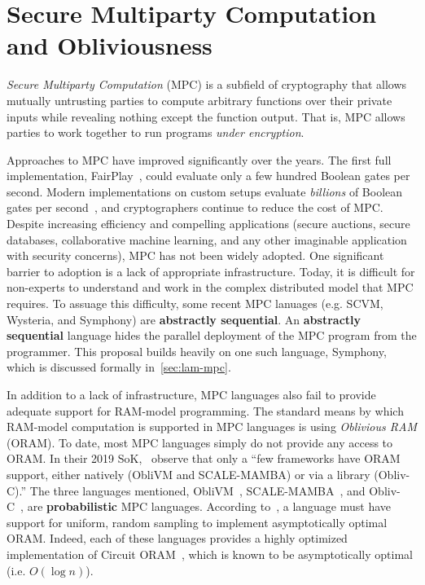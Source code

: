 \documentclass{report}
\begin{document}
\section{Secure Multiparty Computation and Obliviousness}
\label{sec:intro}

\emph{Secure Multiparty Computation} (MPC) is a subfield of cryptography
that allows mutually untrusting parties to compute arbitrary functions over their private inputs while revealing nothing
except the function output. That is, MPC allows parties to work together to run programs \emph{under encryption}.

Approaches to MPC have improved significantly over the years. The first full implementation, FairPlay~\cite{todo}, could evaluate
only a few hundred Boolean gates per second. Modern implementations on custom setups evaluate \emph{billions} of Boolean gates per
second~\cite{todo}, and cryptographers continue to reduce the cost of MPC. Despite increasing efficiency and compelling applications
(secure auctions, secure databases, collaborative machine learning, and any other imaginable application with security concerns),
MPC has not been widely adopted. One significant barrier to adoption is a lack of appropriate infrastructure. Today, it is difficult
for non-experts to understand and work in the complex distributed model that MPC requires. To assuage this difficulty, some recent
MPC lanuages (e.g. SCVM, Wysteria, and Symphony) are \textbf{abstractly sequential}. An \textbf{abstractly sequential} language hides
the parallel deployment of the MPC program from the programmer. This proposal builds heavily on one such language, Symphony, which is
discussed formally in~\cref{sec:lam-mpc}.


In addition to a lack of infrastructure, MPC languages also fail to provide adequate support for RAM-model programming.
The standard means by which RAM-model computation is supported in MPC languages is using \emph{Oblivious RAM} (ORAM). To date, most MPC languages
simply do not provide any access to ORAM. In their 2019 SoK,~\citet{todo} observe that only a ``few frameworks have ORAM support, either
natively (ObliVM and SCALE-MAMBA) or via a library (Obliv-C).'' The three languages mentioned, ObliVM~\cite{todo}, SCALE-MAMBA~\cite{todo}, and
Obliv-C~\cite{todo}, are \textbf{probabilistic} MPC languages. According to~\citet{todo}, a language must have support for uniform, random sampling
to implement asymptotically optimal ORAM. Indeed, each of these languages provides a highly optimized implementation of
Circuit ORAM~\cite{todo}, which is known to be asymptotically optimal (i.e. $O(\log{n})$).
\end{document}
